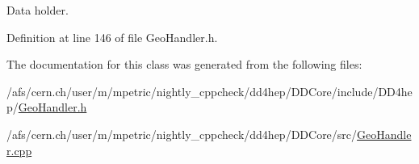 Data holder. 



Definition at line 146 of file Geo\+Handler.\+h.



The documentation for this class was generated from the following files\+:\begin{DoxyCompactItemize}
\item 
/afs/cern.\+ch/user/m/mpetric/nightly\+\_\+cppcheck/dd4hep/\+D\+D\+Core/include/\+D\+D4hep/\hyperlink{_geo_handler_8h}{Geo\+Handler.\+h}\item 
/afs/cern.\+ch/user/m/mpetric/nightly\+\_\+cppcheck/dd4hep/\+D\+D\+Core/src/\hyperlink{_geo_handler_8cpp}{Geo\+Handler.\+cpp}\end{DoxyCompactItemize}
